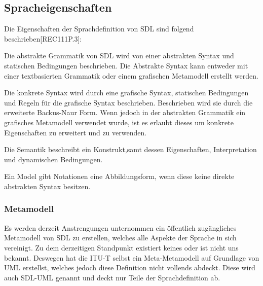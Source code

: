 \subsection{Spracheigenschaften}
\label{ssc:Spracheigenschaften}
Die Eigenschaften der Sprachdefinition von \ac{SDL} sind folgend beschrieben[REC111P.3]:
\begin{itemize}{
		\item[Abstrakte Grammatik] Die abstrakte Grammatik von \ac{SDL} wird von einer abstrakten Syntax und  statischen Bedingungen 
		beschrieben. Die Abstrakte Syntax kann entweder mit einer textbasierten Grammatik oder einem grafischen Metamodell erstellt werden.
		
		\item[Konkrete Grammatik] Die konkrete Syntax wird durch eine grafische Syntax, statischen Bedingungen und Regeln für die grafische Syntax beschrieben.
		Beschrieben wird sie durch die erweiterte Backus-Naur Form. Wenn jedoch in der abstrakten Grammatik ein 
		grafisches Metamodell verwendet wurde, ist es erlaubt dieses um konkrete Eigenschaften zu erweitert und zu verwenden.
		
		\item[Semantik] Die Semantik beschreibt ein Konstrukt,samt dessen Eigenschaften, Interpretation und dynamischen Bedingungen.
		
		\item[Model] Ein Model gibt Notationen eine Abbildungsform, wenn diese keine direkte abstrakten Syntax besitzen.
}\end{itemize}

\subsubsection{Metamodell}
\label{ssc:Metamodell}
Es werden derzeit Anstrengungen unternommen ein öffentlich zugängliches Metamodell von \ac{SDL} zu erstellen, welches alle Aspekte der Sprache in sich vereinigt. Zu dem derzeitigen Standpunkt existiert keines oder ist nicht uns bekannt. Deswegen hat die \ac{ITU-T} selbst ein Meta-Metamodell auf Grundlage von 
\ac{UML} erstellst, welches jedoch diese Definition nicht vollends abdeckt. Diese wird auch SDL-UML genannt und deckt nur Teile der Sprachdefinition ab.
